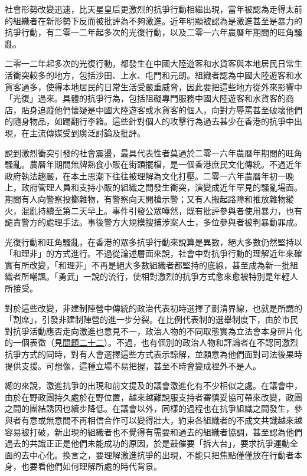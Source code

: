 社會形勢改變迅速，比天星皇后更激烈的抗爭行動相繼出現，當年被認為走得太前的組織者在新形勢下反而被批評為不夠激進。近年明顯被認為是激進甚至是暴力的抗爭行動，有二零一二年起多次的光復行動，以及二零一六年農曆年期間的旺角騷亂。

二零一二年起多次的光復行動，都發生在中國大陸遊客和水貨客與本地居民日常生活衝突較多的地方，包括沙田、上水、屯門和元朗。組織者認為中國大陸遊客和水貨客過多，使得本地居民的日常生活受嚴重威脅，因此要把這些地方從外來影響中「光復」過來。具體的抗爭行為，包括阻礙專門服務中國大陸遊客和水貨客的商店，貼身追蹤他們懷疑是中國大陸遊客或水貨客的個人，向對方辱罵甚至破壞他們的隨身物品，如踢翻行李箱。這些針對個人的攻擊行為過去甚少在香港的抗爭中出現，在主流傳媒受到廣泛討論及批評。

說到激烈衝突引發的社會震盪，最具代表性者莫過於二零一六年農曆年期間的旺角騷亂。農曆年期間無牌熟食小販在街頭擺檔，是一個香港庶民文化傳統。不過近年政府執法趨嚴，在本土思潮下往往被理解為文化打壓。二零一六年農曆年初一晚上，政府管理人員和支持小販的組織之間發生衝突，演變成近年罕見的騷亂場面。期間有人向警察投擲雜物，有警察向天開槍示警；又有人搬起路障和推放雜物縱火，混亂持續至第二天早上。事件引發公眾嘩然，既有批評參與者使用暴力，也有譴責警方的處理手法。事後警方大規模搜捕涉案人士，多位參與者被判暴動罪成。

光復行動和旺角騷亂，在香港的眾多抗爭行動來說算是異數，絕大多數仍然堅持以「和理非」的方式進行。不過從論述層面來說，社會中對抗爭行動的理解近年來確實有所改變，「和理非」不再是絕大多數組織者都堅持的底線，甚至成為新一批組織者所嘲諷。「勇武」一說的流行，使相對激烈的抗爭方式愈來愈被特別是年輕人所接受。

對於這些改變，非建制陣營中傳統的政治代表初時選擇了劃清界線，也就是所謂的「割席」，引發非建制陣營的進一步分裂。在比例代表制的選舉制度下，由於市民對抗爭活動應否走向激進也意見不一，政治人物的不同取態實為立法會本身碎片化的一個表徵（見\hyperref[sec:sec22]{問題二十二}）。不過，也有個別的政治人物和評論者在不認同激烈抗爭方式的同時，對有人會選擇這些方式表示諒解，並願意為他們面對司法後果時提供支援。可想像，這種立場不易把握，甚至不時會變成裡外不是人。

總的來說，激進抗爭的出現和前文提及的議會激進化有不少相似之處。在議會中，由於在野政團持久處於在野位置，越來越難說服支持者審慎妥協可帶來改變，政團之間的團結誘因也續步降低。在議會以外，同樣的過程也在抗爭組織之間發生，參與者有意或無意間不再相信合作可以變得壯大，約束各組織者的不成文共識越來越容易被打破，新出現的組織者也不覺得有需要和過去的組織者協調，甚至認為他們過去的共識正正是他們未能成功的原因，於是鼓催要「拆大台」，要求抗爭運動全面的去中心化。換言之，要理解激進抗爭的出現，不能只把焦點僅僅放在行動者本身，也要看他們如何理解所處的時代背景。

